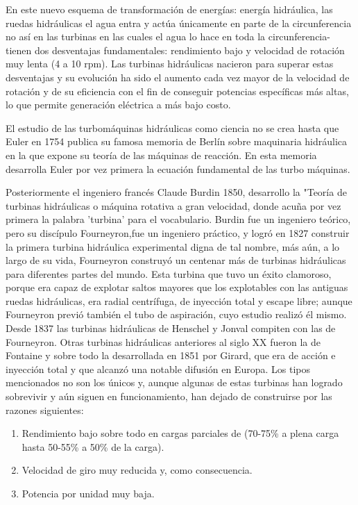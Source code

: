 \documentclass[12pt,letterpaper,superscriptaddress]{article}
\begin{document}
En este nuevo esquema de transformación de energías: energía hidráulica, las ruedas hidráulicas el agua entra y actúa únicamente en parte de la circunferencia no así en las turbinas en las cuales el agua lo hace en toda la circunferencia- tienen dos desventajas fundamentales: rendimiento bajo y velocidad de rotación muy lenta (4 a 10 rpm). Las turbinas hidráulicas nacieron para superar estas desventajas y su evolución ha sido el aumento cada vez mayor de la velocidad de rotación y de su eficiencia con el fin de conseguir potencias específicas más altas, lo que permite generación eléctrica a más bajo costo.

El estudio de las turbomáquinas hidráulicas como ciencia no se crea hasta que Euler en 1754 publica su famosa memoria de Berlín sobre maquinaria hidráulica en la que expone su teoría de las máquinas de reacción. En esta memoria desarrolla Euler por vez primera la ecuación fundamental de las turbo máquinas. 

Posteriormente el ingeniero francés Claude Burdin 1850, desarrollo la "Teoría de turbinas hidráulicas o máquina rotativa a gran velocidad, donde acuña por vez primera la palabra 'turbina' para el vocabulario. Burdin fue un ingeniero teórico, pero su discípulo Fourneyron,fue un ingeniero práctico, y logró en 1827 construir la primera turbina hidráulica experimental digna de tal nombre, más aún, a lo largo de su vida, Fourneyron construyó un centenar más de turbinas hidráulicas para diferentes partes del mundo. Esta turbina que tuvo un éxito clamoroso, porque era capaz de explotar saltos mayores que los explotables con las antiguas ruedas hidráulicas, era radial centrífuga, de inyección total y escape libre; aunque Fourneyron previó también el tubo de aspiración, cuyo estudio realizó él mismo. Desde 1837 las turbinas hidráulicas de Henschel y Jonval compiten con las de Fourneyron. Otras turbinas hidráulicas anteriores al siglo XX fueron la de Fontaine y sobre todo la desarrollada en 1851 por Girard, que era de acción e inyección total y que alcanzó una notable difusión en Europa. Los tipos mencionados no son los únicos y, aunque algunas de estas turbinas han logrado sobrevivir y aún siguen en funcionamiento, han dejado de construirse por las razones siguientes:

\begin{enumerate}

	\item Rendimiento bajo sobre todo en cargas parciales de (70-75\% a plena carga hasta 50-55\% a 50\% de la carga).
	\item Velocidad de giro muy reducida y, como consecuencia.
	\item Potencia por unidad muy baja.
	
\end{enumerate}
\end{document}
